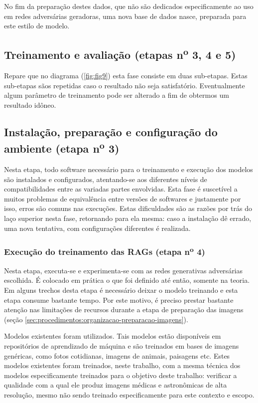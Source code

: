 No fim da preparação destes dados, que não são dedicados especificamente ao uso em redes adversárias geradoras, uma nova base de dados nasce, preparada para este estilo de modelo.

\subsection{Treinamento e avaliação (etapas n\textsuperscript{o} 3, 4 e 5)}
\label{sec:procedimentos:treinamento-avaliacao}

Repare que no diagrama (\ref{fig:fig9}) esta fase consiste em duas sub-etapas. Estas sub-etapas sãos repetidas caso o resultado não seja satisfatório. Eventualmente algum parâmetro de treinamento pode ser alterado a fim de obtermos um resultado idôneo.

\subsection{Instalação, preparação e configuração do ambiente (etapa n\textsuperscript{o} 3)}

Nesta etapa, todo software necessário para o treinamento e execução dos modelos são instalados e configurados, atentando-se aos diferentes níveis de compatibilidades entre as variadas partes envolvidas. Esta fase é suscetível a muitos problemas de equivalência entre versões de softwares e justamente por isso, erros são comuns nas execuções. Estas dificuldades são as razões por trás do laço superior nesta fase, retornando para ela mesma: caso a instalação dê errado, uma nova tentativa, com configurações diferentes é realizada.

\subsubsection{Execução do treinamento das RAGs (etapa n\textsuperscript{o} 4)}

Nesta etapa, executa-se e experimenta-se com as redes generativas adversárias escolhida. É colocado em prática o que foi definido até então, somente na teoria. Em alguns trechos desta etapa é necessário deixar o modelo treinando e esta etapa consume bastante tempo. Por este motivo, é preciso prestar bastante atenção nas limitações de recursos durante a etapa de preparação das imagens (seção \ref{sec:procedimentos:organizacao-preparacao-imagens}). 

Modelos existentes foram utilizados. Tais modelos estão disponíveis em repositórios de aprendizado de máquina e são treinados em bases de imagens genéricas, como fotos cotidianas, imagens de animais, paisagens etc. Estes modelos existentes foram treinados, neste trabalho, com a mesma técnica dos modelos especificamente treinados para o objetivo deste trabalho: verificar a qualidade com a qual ele produz imagens médicas e astronômicas de alta resolução, mesmo não sendo treinado especificamente para este contexto e escopo.


